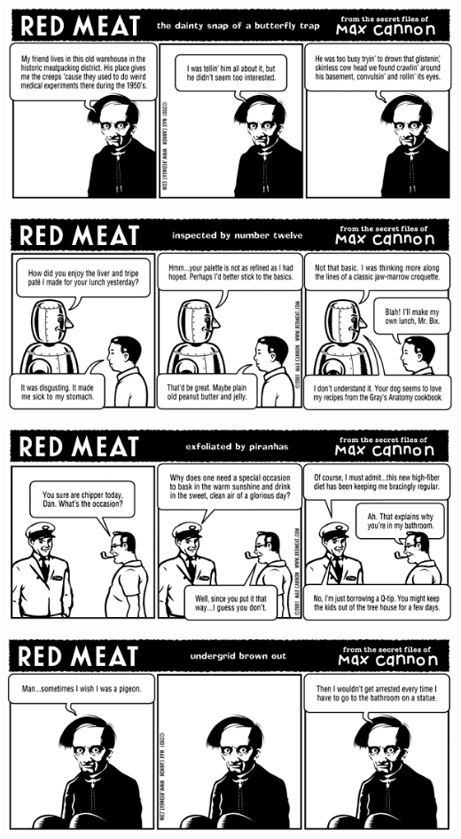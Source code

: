 \documentclass[a4paper,twoside,11pt]{article}
\begin{document}
\includegraphics[width=\textwidth]{redmeat_2001-10-02.png}



\includegraphics[width=\textwidth]{redmeat_2001-10-09.png}



\includegraphics[width=\textwidth]{redmeat_2001-10-16.png}



\includegraphics[width=\textwidth]{redmeat_2001-10-23.png}
\end{document}
